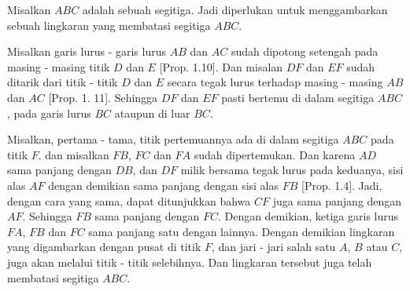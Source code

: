 \documentclass[a4paper]{book}
\begin{document}
\begin{center}
\end{center}
Misalkan $ABC$ adalah sebuah segitiga. Jadi diperlukan untuk menggambarkan
sebuah lingkaran yang membatasi segitiga $ABC$.

Misalkan garis lurus - garis lurus $AB$ dan $AC$ sudah dipotong setengah pada
masing - masing titik $D$ dan $E$ [Prop. 1.10]. Dan misalan $DF$ dan $EF$ sudah
ditarik dari titik - titik $D$ dan $E$ secara tegak lurus terhadap masing - 
masing $AB$ dan $AC$ [Prop. 1. 11]. Sehingga $DF$ dan $EF$ pasti bertemu di 
dalam segitiga $ABC$, pada garis lurus $BC$ ataupun di luar $BC$.

Misalkan, pertama - tama, titik pertemuannya ada di dalam segitiga $ABC$ pada
titik $F$. dan misalkan $FB$, $FC$ dan $FA$ sudah dipertemukan. Dan karena
$AD$ sama panjang dengan $DB$, dan $DF$ milik bersama tegak lurus pada keduanya,
sisi alas $AF$ dengan demikian sama panjang dengan sisi alas $FB$ [Prop. 1.4].
Jadi, dengan cara yang sama, dapat ditunjukkan bahwa $CF$ juga sama panjang 
dengan  $AF$. Sehingga $FB$ sama panjang dengan $FC$. Dengan demikian, ketiga
garis lurus $FA$, $FB$ dan $FC$ sama panjang satu dengan lainnya. Dengan 
demikian lingkaran yang digambarkan dengan pusat di titik $F$, dan jari - jari 
salah satu $A$, $B$ atau $C$, juga akan melalui titik - titik selebihnya. Dan 
lingkaran tersebut juga telah membatasi segitiga $ABC$.
\end{document}
